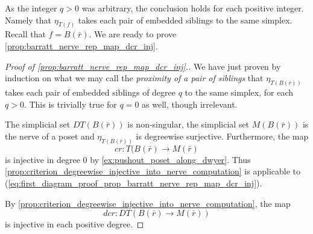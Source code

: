 As the integer $q>0$ was arbitrary, the conclusion holds for each positive integer. Namely that $\eta _{T(f)}$ takes each pair of embedded siblings to the same simplex. Recall that $f=B(\bar{r} )$. We are ready to prove \cref{prop:barratt_nerve_rep_map_dcr_inj}.
\begin{proof}[Proof of \cref{prop:barratt_nerve_rep_map_dcr_inj}.]
We have just proven by induction on what we may call the \emph{proximity of a pair of siblings} that $\eta _{T(B(\bar{r} ))}$ takes each pair of embedded siblings of degree $q$ to the same simplex, for each $q>0$. This is trivially true for $q=0$ as well, though irrelevant.

The simplicial set $DT(B(\bar{r} ))$ is non-singular, the simplicial set $M(B(\bar{r} ))$ is the nerve of a poset and $\eta _{T(B(\bar{r} ))}$ is degreewise surjective. Furthermore, the map
\[cr:T(B(\bar{r} )\to M(\bar{r} )\]
is injective in degree $0$ by \cref{ex:pushout_poset_along_dwyer}. Thus \cref{prop:criterion_degreewise_injective_into_nerve_computation} is applicable to (\ref{eq:first_diagram_proof_prop_barratt_nerve_rep_map_dcr_inj}).

By \cref{prop:criterion_degreewise_injective_into_nerve_computation}, the map
\[dcr:DT(B(\bar{r} )\to M(\bar{r} ))\]
is injective in each positive degree.
\end{proof}





